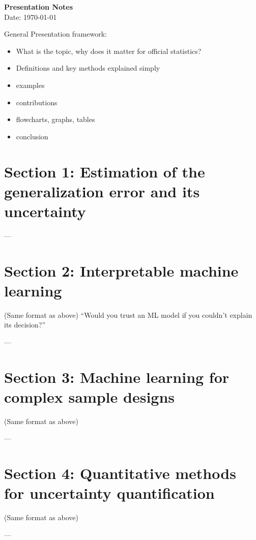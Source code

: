 \documentclass[a4paper,12pt]{article}
\begin{document}
\begin{center}
    {\LARGE \textbf{Presentation Notes}} \\
    \vspace{0.2cm}
    {\small Date: \today}
\end{center}

General Presentation framework:
\begin{itemize}
    \item What is the topic, why does it matter for official statistics?
    \item Definitions and key methods explained simply
    \item examples
    \item contributions
    \item flowcharts, graphs, tables
    \item conclusion
\end{itemize}
\section{Section 1: Estimation of the generalization error and its uncertainty}

---

\section{Section 2:  Interpretable machine learning }
(Same format as above)
“Would you trust an ML model if you couldn’t explain its decision?”

---

\section{Section 3:  Machine learning for complex sample designs }
(Same format as above)

---

\section{Section 4: Quantitative methods for uncertainty quantification}
(Same format as above)

---
\end{document}
